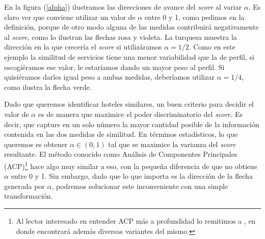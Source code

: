 \documentclass[12pt]{report}
\begin{document}
En la figura (\ref{alpha}) ilustramos las direcciones de avance del \emph{score} al variar $\alpha$. Es claro ver que conviene utilizar un valor de $\alpha$ entre 0 y 1, como pedimos en la definición, porque de otro modo alguna de las medidas contribuirá negativamente al \emph{score}, como lo ilustran las flechas rosa y violeta. La turquesa muestra la dirección en la que crecería el \emph{score} si utilizáramos $\alpha = 1/2$. Como en este ejemplo la similitud de servicios tiene una menor variabilidad que la de perfil, si escogiéramos ese valor, le estaríamos dando un mayor peso al perfil. Si quisiéramos darles igual peso a ambas medidas, deberíamos utilizar $\alpha = 1/4$, como ilustra la flecha verde.

Dado que queremos identificar hoteles similares, un buen criterio para decidir el valor de $\alpha$ es de manera que maximice el poder discriminatorio del \emph{score}. Es decir, que capture en un solo número la mayor cantidad posible de la información contenida en las dos medidas de similitud. En términos estadísticos, lo que queremos es obtener $\alpha \in (0,1)$ tal que se maximice la varianza del \emph{score} resultante. El método conocido como Análisis de Componentes Principales (ACP)\footnote{Al lector interesado en entender ACP más a profundidad lo remitimos a \cite{elements}, en donde encontrará además diversas variantes del mismo.} hace algo muy similar a eso, con la pequeña diferencia de que no obtiene $\alpha$ entre 0 y 1. Sin embargo, dado que lo que importa es la dirección de la flecha generada por $\alpha$, podremos solucionar este inconveniente con una simple transformación.
\end{document}
